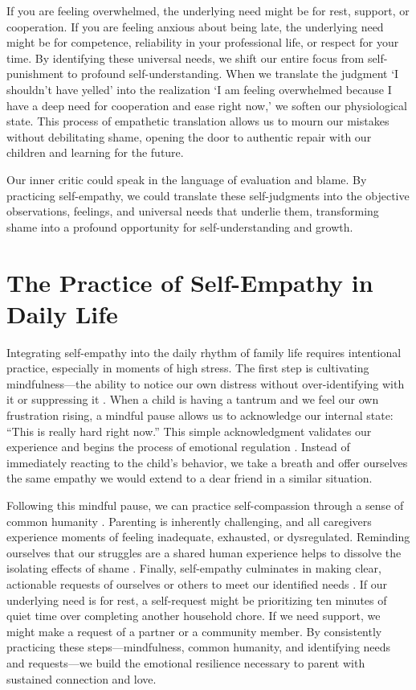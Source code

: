 If you are feeling overwhelmed, the underlying need might be for rest, support, or cooperation.
If you are feeling anxious about being late, the underlying need might be for competence, reliability in your professional life, or respect for your time.
By identifying these universal needs, we shift our entire focus from self-punishment to profound self-understanding.
When we translate the judgment `I shouldn't have yelled' into the realization `I am feeling overwhelmed because I have a deep need for cooperation and ease right now,' we soften our physiological state.
This process of empathetic translation allows us to mourn our mistakes without debilitating shame, opening the door to authentic repair with our children and learning for the future.

\begin{keyinsight}
Our inner critic could speak in the language of evaluation and blame.
By practicing self-empathy, we could translate these self-judgments into the objective observations, feelings, and universal needs that underlie them, transforming shame into a profound opportunity for self-understanding and growth.
\end{keyinsight}

\section{The Practice of Self-Empathy in Daily Life}

Integrating self-empathy into the daily rhythm of family life requires intentional practice, especially in moments of high stress.
The first step is cultivating mindfulness---the ability to notice our own distress without over-identifying with it or suppressing it \citep{neff2003}.
When a child is having a tantrum and we feel our own frustration rising, a mindful pause allows us to acknowledge our internal state: ``This is really hard right now.''
This simple acknowledgment validates our experience and begins the process of emotional regulation \citep{lieberman2007}.
Instead of immediately reacting to the child's behavior, we take a breath and offer ourselves the same empathy we would extend to a dear friend in a similar situation.

Following this mindful pause, we can practice self-compassion through a sense of common humanity \citep{neff2003}.
Parenting is inherently challenging, and all caregivers experience moments of feeling inadequate, exhausted, or dysregulated.
Reminding ourselves that our struggles are a shared human experience helps to dissolve the isolating effects of shame \citep{brown2012}.
Finally, self-empathy culminates in making clear, actionable requests of ourselves or others to meet our identified needs \citep{rosenberg2003}.
If our underlying need is for rest, a self-request might be prioritizing ten minutes of quiet time over completing another household chore.
If we need support, we might make a request of a partner or a community member.
By consistently practicing these steps---mindfulness, common humanity, and identifying needs and requests---we build the emotional resilience necessary to parent with sustained connection and love.

